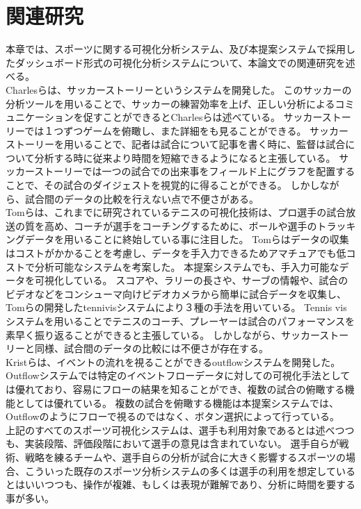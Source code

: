 \documentclass[sotsuron]{kuee}
\begin{document}
\chapter{関連研究}
	本章では、スポーツに関する可視化分析システム、及び本提案システムで採用したダッシュボード形式の可視化分析システムについて、本論文での関連研究を述べる。
	\\Charlesらは、サッカーストーリーというシステムを開発した。
	このサッカーの分析ツールを用いることで、サッカーの練習効率を上げ、正しい分析によるコミュニケーションを促すことができるとCharlesらは述べている。
	サッカーストーリーでは１つずつゲームを俯瞰し、また詳細をも見ることができる。
	サッカーストーリーを用いることで、記者は試合について記事を書く時に、監督は試合について分析する時に従来より時間を短縮できるようになると主張している。
	サッカーストーリーでは一つの試合での出来事をフィールド上にグラフを配置することで、その試合のダイジェストを視覚的に得ることができる。
	しかしながら、試合間のデータの比較を行えない点で不便さがある。
	\\Tomらは、これまでに研究されているテニスの可視化技術は、プロ選手の試合放送の質を高め、コーチが選手をコーチングするために、ボールや選手のトラッキングデータを用いることに終始している事に注目した。
	Tomらはデータの収集はコストがかかることを考慮し、データを手入力できるためアマチュアでも低コストで分析可能なシステムを考案した。
	本提案システムでも、手入力可能なデータを可視化している。
	スコアや、ラリーの長さや、サーブの情報や、試合のビデオなどをコンシューマ向けビデオカメラから簡単に試合データを収集し、Tomらの開発したtennivisシステムにより３種の手法を用いている。
	Tennis visシステムを用いることでテニスのコーチ、プレーヤーは試合のパフォーマンスを素早く振り返ることができると主張している。
	しかしながら、サッカーストーリーと同様、試合間のデータの比較には不便さが存在する。
	\\Kristらは、イベントの流れを視ることができるoutflowシステムを開発した。
	Outflowシステムでは特定のイベントフローデータに対しての可視化手法としては優れており、容易にフローの結果を知ることができ、複数の試合の俯瞰する機能としては優れている。
	複数の試合を俯瞰する機能は本提案システムでは、Outflowのようにフローで視るのではなく、ボタン選択によって行っている。	
	\\上記のすべてのスポーツ可視化システムは、選手も利用対象であるとは述べつつも、実装段階、評価段階において選手の意見は含まれていない。
	選手自らが戦術、戦略を練るチームや、選手自らの分析が試合に大きく影響するスポーツの場合、こういった既存のスポーツ分析システムの多くは選手の利用を想定しているとはいいつつも、操作が複雑、もしくは表現が難解であり、分析に時間を要する事が多い。
\end{document}
